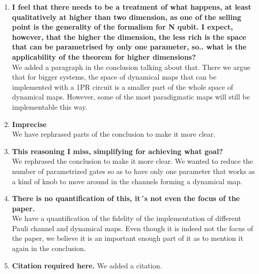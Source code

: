 \documentclass[10pt,letterpaper]{article} %
\begin{document}
\begin{enumerate}
 \item  \textbf{I feel that there needs to be a treatment of what happens, at least qualitatively at higher than two dimension, as one of the selling point is the generality of the formalism for N qubit. I expect, however, that the higher the dimension, the less rich is the space that can be parametrised by only one parameter, so.. what is the applicability of the theorem for higher dimensions?} \\
 
We added a paragraph in the conclusion talking about that.
There we argue that for bigger systems, the space of dynamical maps
that can be implemented with a 1PR circuit
is a smaller part of the whole space of dynamical maps.
However, some of the most paradigmatic maps will still be implementable this way.
  
\item \textbf{Imprecise} \\ 
 
We have rephrased parts of the conclusion to make it more clear.
 
 
\item \textbf{This reasoning I miss, simplifying for achieving what goal? } \\
 
We rephrased the conclusion to make it more clear. We wanted to reduce the number of parametrized gates
so as to have only one parameter that works as a kind of knob to move around in the channels forming
a dynamical map.
  
\item\textbf{ There is no quantification of this, it´s not even the focus of the paper.}  \\
 
We have a quantification of the fidelity of the implementation of different Pauli channel and dynamical maps.
 Even though it is indeed not the focus of the paper, we believe it
 is an important enough part of it as to mention it again in the conclusion.
 
\item \textbf{Citation required here.}
We added a citation.
\end{enumerate}
\end{document}
